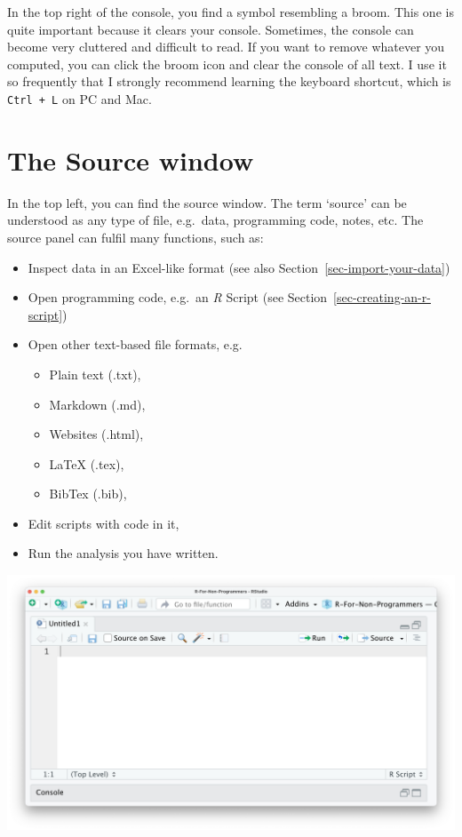 \documentclass[
  letterpaper,
  DIV=11,
  numbers=noendperiod]{scrreprt}
\begin{document}
In the top right of the console, you find a symbol resembling a broom.
This one is quite important because it clears your console. Sometimes,
the console can become very cluttered and difficult to read. If you want
to remove whatever you computed, you can click the broom icon and clear
the console of all text. I use it so frequently that I strongly
recommend learning the keyboard shortcut, which is \texttt{Ctrl\ +\ L}
on PC and Mac.

\section{The Source window}\label{sec-the-source-window}

In the top left, you can find the source window. The term `source' can
be understood as any type of file, e.g.~data, programming code, notes,
etc. The source panel can fulfil many functions, such as:

\begin{itemize}
\item
  Inspect data in an Excel-like format (see also
  Section~\ref{sec-import-your-data})
\item
  Open programming code, e.g.~an \emph{R} Script (see
  Section~\ref{sec-creating-an-r-script})
\item
  Open other text-based file formats, e.g.

  \begin{itemize}
  \item
    Plain text (.txt),
  \item
    Markdown (.md),
  \item
    Websites (.html),
  \item
    LaTeX (.tex),
  \item
    BibTex (.bib),
  \end{itemize}
\item
  Edit scripts with code in it,
\item
  Run the analysis you have written.
\end{itemize}

\includegraphics{images/chapter_04_img/03_source_window/01_rstudio_source.png}
\end{document}
